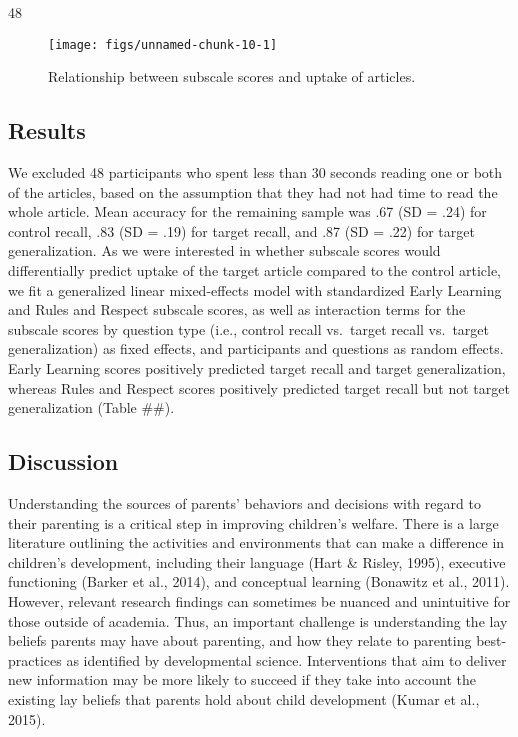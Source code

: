 \documentclass[10pt, letterpaper]{article}
\newenvironment{CodeChunk}{}{}
\begin{document}
\begin{CodeChunk}
\begin{CodeOutput}
[1] 48
\end{CodeOutput}
\end{CodeChunk}

\begin{CodeChunk}
\begin{figure*}[!h]

{\centering \texttt{[image: figs/unnamed-chunk-10-1]} 

}

\caption[Relationship between subscale scores and uptake of articles]{Relationship between subscale scores and uptake of articles.}\label{fig:unnamed-chunk-10}
\end{figure*}
\end{CodeChunk}

\subsection{Results}\label{results}

We excluded 48 participants who spent less than 30 seconds reading one
or both of the articles, based on the assumption that they had not had
time to read the whole article. Mean accuracy for the remaining sample
was .67 (SD = .24) for control recall, .83 (SD = .19) for target recall,
and .87 (SD = .22) for target generalization. As we were interested in
whether subscale scores would differentially predict uptake of the
target article compared to the control article, we fit a generalized
linear mixed-effects model with standardized Early Learning and Rules
and Respect subscale scores, as well as interaction terms for the
subscale scores by question type (i.e., control recall vs.~target recall
vs.~target generalization) as fixed effects, and participants and
questions as random effects. Early Learning scores positively predicted
target recall and target generalization, whereas Rules and Respect
scores positively predicted target recall but not target generalization
(Table \#\#).

\subsection{Discussion}\label{discussion}

Understanding the sources of parents' behaviors and decisions with
regard to their parenting is a critical step in improving children's
welfare. There is a large literature outlining the activities and
environments that can make a difference in children's development,
including their language (Hart \& Risley, 1995), executive functioning
(Barker et al., 2014), and conceptual learning (Bonawitz et al., 2011).
However, relevant research findings can sometimes be nuanced and
unintuitive for those outside of academia. Thus, an important challenge
is understanding the lay beliefs parents may have about parenting, and
how they relate to parenting best-practices as identified by
developmental science. Interventions that aim to deliver new information
may be more likely to succeed if they take into account the existing lay
beliefs that parents hold about child development (Kumar et al., 2015).
\end{document}
